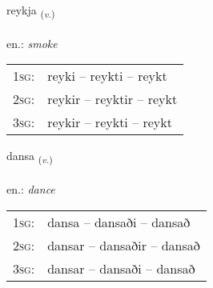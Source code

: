 \documentclass[frontgrid, backgrid]{flacards}\usepackage[]{graphicx}\usepackage[]{xcolor}
\begin{document}
\renewcommand{\flhead}{\vskip5pt \fboxsep=0pt {\small\bfseries\footnotesize Sagnorð | Verb}}
\renewcommand{\fcfoot}{\vskip5pt \fboxsep=0pt \hspace{2pt}{\small\bfseries\footnotesize 2K}}

\renewcommand{\blhead}{\vskip5pt {\small\bfseries\footnotesize Sagnorð | Verb }}
\renewcommand{\bcfoot}{\vskip5pt \hspace{2pt}{\small\bfseries\footnotesize 2K}}


{reykja \small{\textsubscript{(\textit{v.})}} \\[1ex] %
\textphonetic{[reiːca]} \\
en.: \emph{smoke} \\  [2ex]
\renewcommand*{\arraystretch}{0.8}
\begin{tabular}{p{1cm}l}
\textsc{1sg}: & reyki -- reykti -- reykt \\ 
\textsc{2sg}: & reykir -- reyktir -- reykt \\ 
\textsc{3sg}: & reykir -- reykti -- reykt \\ 
\end{tabular}
}

\renewcommand{\flhead}{\vskip5pt \fboxsep=0pt {\small\bfseries\footnotesize Sagnorð | Verb}}
\renewcommand{\fcfoot}{\vskip5pt \fboxsep=0pt \hspace{2pt}{\small\bfseries\footnotesize 2K}}

\renewcommand{\blhead}{\vskip5pt {\small\bfseries\footnotesize Sagnorð | Verb }}
\renewcommand{\bcfoot}{\vskip5pt \hspace{2pt}{\small\bfseries\footnotesize 2K}}


{dansa \small{\textsubscript{(\textit{v.})}} \\[1ex] %
\textphonetic{[tansa]} \\
en.: \emph{dance} \\  [2ex]
\renewcommand*{\arraystretch}{0.8}
\begin{tabular}{p{1cm}l}
\textsc{1sg}: & dansa -- dansaði -- dansað \\ 
\textsc{2sg}: & dansar -- dansaðir -- dansað \\ 
\textsc{3sg}: & dansar -- dansaði -- dansað \\ 
\end{tabular}
}
\end{document}
